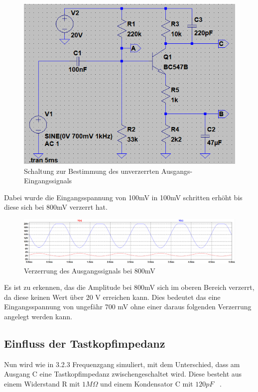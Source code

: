             \begin{figure}[h!]
                \centering
                \includegraphics[width=0.7\linewidth]{325.PNG}
                \caption{Schaltung zur Bestimmung des unverzerrten Ausgangs- Eingangssignals}
            \end{figure}

            Dabei wurde die Eingangsspannung von 100mV in 100mV schritten erhöht bis diese sich bei 800mV verzerrt hat.
            \begin{figure}[h!]
                \centering
                \includegraphics[width=\linewidth]{3251.PNG}
                \caption{Verzerrung des Ausgangssignals bei 800mV}
            \end{figure}
            Es ist zu erkennen, das die Amplitude bei 800mV sich im oberen Bereich verzerrt, da diese keinen Wert über 20 V erreichen kann. Dies bedeutet das eine Eingangsspannung von ungefähr 700 mV ohne einer daraus folgenden Verzerrung angelegt werden kann.


            \newpage
        \subsection{Einfluss der Tastkopfimpedanz}
            Nun wird wie in 3.2.3 Frequenzgang simuliert, mit dem Unterschied, dass am Ausgang C eine Tastkopfimpedanz zwischengeschaltet wird. Diese besteht aus einem Widerstand R mit $1M\Omega$ und einem Kondensator C mit $120pF$ ~\cite{tastkopf_standard}.

